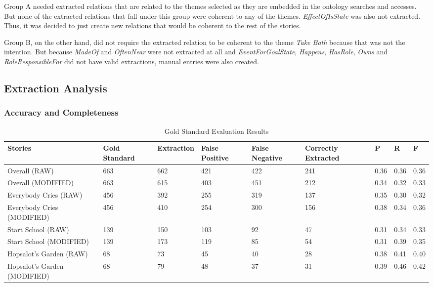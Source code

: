 Group A needed extracted relations that are related to the themes selected as they are embedded in the ontology searches and accesses. But none of the extracted relations that fall under this group were coherent to any of the themes. \textit{EffectOfIsState} was also not extracted. Thus, it was decided to just create new relations that would be coherent to the rest of the stories. 

Group B, on the other hand, did not require the extracted relation to be coherent to the theme \textit{Take Bath} because that was not the intention. But because \textit{MadeOf} and \textit{OftenNear} were not extracted at all and \textit{EventForGoalState}, \textit{Happens}, \textit{HasRole}, \textit{Owns} and \textit{RoleResponsibleFor} did not have valid extractions, manual entries were also created.

\subsection{Extraction Analysis}
\label{sec:extractionanalysis}

\subsubsection{Accuracy and Completeness}

\begin{table}[H]   %
\centering
\footnotesize
\caption{Gold Standard Evaluation Results} \vspace{0.25em}
\begin{tabular}{|p{2cm}|p{1cm}|p{2cm}|p{1cm}|p{1cm}|p{1.5cm}|p{.5cm}|p{.5cm}|p{.5cm}|} \hline
\textbf{Stories} & \textbf{Gold Standard} & \textbf{Extraction} & \textbf{False Positive} & \textbf{False Negative} & \textbf{Correctly Extracted} & \textbf{P} & \textbf{R} & \textbf{F} \\ \hline
Overall (RAW) & 663 & 662 & 421 & 422 & 241 & 0.36 & 0.36 & 0.36 \\ \hline
Overall (MODIFIED) & 663 & 615 & 403 & 451 & 212 & 0.34 & 0.32 & 0.33 \\ \hline
Everybody Cries (RAW) & 456 & 392 & 255 & 319 & 137 & 0.35 & 0.30 & 0.32 \\ \hline
Everybody Cries (MODIFIED) & 456 & 410 & 254 & 300 & 156 & 0.38 & 0.34 & 0.36 \\ \hline
Start School (RAW) & 139 & 150 & 103 & 92 & 47 & 0.31 & 0.34 & 0.33 \\ \hline
Start School (MODIFIED) & 139 & 173 & 119 & 85 & 54 & 0.31 & 0.39 & 0.35 \\ \hline
Hopsalot's Garden (RAW) & 68 & 73 & 45 & 40 & 28 & 0.38 & 0.41 & 0.40 \\ \hline
Hopsalot's Garden (MODIFIED) & 68 & 79 & 48 & 37 & 31 & 0.39 & 0.46 & 0.42 \\ \hline
\end{tabular}
\label{tab:goldsum}
\end{table}

